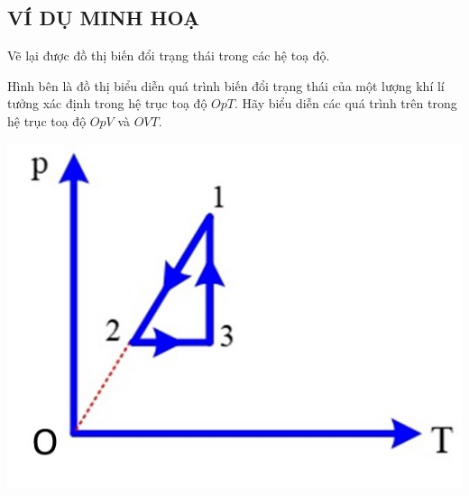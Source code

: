 \subsection{VÍ DỤ MINH HOẠ}
\begin{dang}{Vẽ lại được đồ thị biến đổi trạng thái trong các hệ toạ độ.}
	\end{dang}
\begin{vd}
	Hình bên là đồ thị biểu diễn quá trình biến đổi trạng thái của một lượng khí lí tưởng xác định trong hệ trục toạ độ $OpT$. Hãy biểu diễn các quá trình trên trong hệ trục toạ độ $OpV$ và $OVT$.
		\begin{center}
			\includegraphics[width=0.25\linewidth]{figs/VN12-Y24-PH-SYL-014-2}
		\end{center}
\end{vd}

